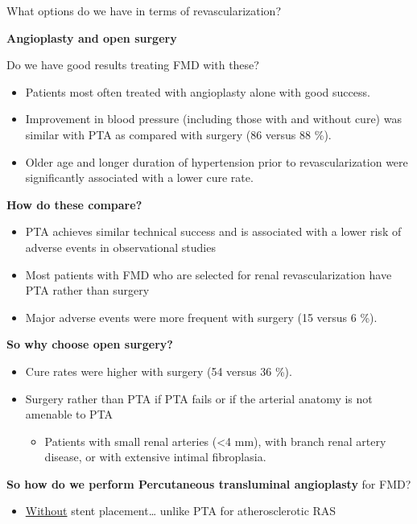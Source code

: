\documentclass[
]{book}
\providecommand{\tightlist}{%
  \setlength{\itemsep}{0pt}\setlength{\parskip}{0pt}}
\begin{document}
What options do we have in terms of revascularization?

\textbf{Angioplasty and open surgery}

Do we have good results treating FMD with these?

\begin{itemize}
\item
  Patients most often treated with angioplasty alone with good
  success. \citep{daviesLongtermOutcomesPercutaneous2008, jenkinsOutcomesHypertensivePatients2015}
\item
  Improvement in blood pressure (including those with and without
  cure) was similar with PTA as compared with surgery (86 versus 88
  \%).
\item
  Older age and longer duration of hypertension prior to
  revascularization were significantly associated with a lower cure
  rate.
\end{itemize}

\textbf{How do these compare?}

\begin{itemize}
\item
  PTA achieves similar technical success and is associated with a
  lower risk of adverse events in observational studies
\item
  Most patients with FMD who are selected for renal revascularization
  have PTA rather than surgery
\item
  Major adverse events were more frequent with surgery (15 versus 6
  \%).
\end{itemize}

\textbf{So why choose open surgery?}

\begin{itemize}
\item
  Cure rates were higher with surgery (54 versus 36 \%).
\item
  Surgery rather than PTA if PTA fails or if the arterial anatomy is
  not amenable to PTA

  \begin{itemize}
  \tightlist
  \item
    Patients with small renal arteries (\textless4 mm), with branch renal
    artery disease, or with extensive intimal fibroplasia.
  \end{itemize}
\end{itemize}

\textbf{So how do we perform Percutaneous transluminal angioplasty} for FMD?

\begin{itemize}
\tightlist
\item
  \underline{Without} stent placement\ldots{} unlike PTA for atherosclerotic RAS
\end{itemize}
\end{document}
